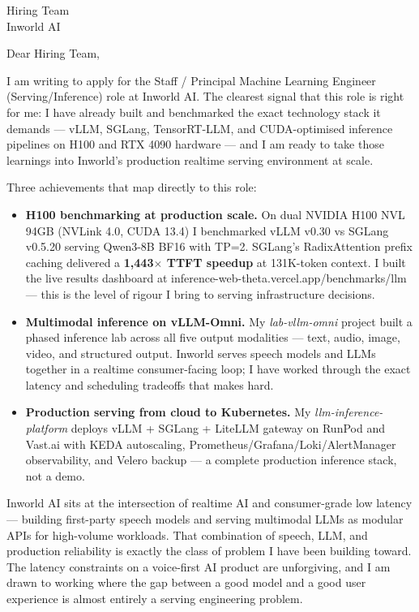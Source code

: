 \documentclass[12pt]{letter}
\date{26 October 2026}
\begin{document}
\begin{letter}{Hiring Team \\ Inworld AI}

\opening{Dear Hiring Team,}

I am writing to apply for the Staff / Principal Machine Learning Engineer (Serving/Inference) role at Inworld AI.
The clearest signal that this role is right for me: I have already built and benchmarked the exact technology stack it demands — vLLM, SGLang, TensorRT-LLM, and CUDA-optimised inference pipelines on H100 and RTX 4090 hardware — and I am ready to take those learnings into Inworld's production realtime serving environment at scale.

Three achievements that map directly to this role:

\begin{itemize}
  \item \textbf{H100 benchmarking at production scale.} On dual NVIDIA H100 NVL 94GB (NVLink 4.0, CUDA 13.4) I benchmarked vLLM v0.30 vs SGLang v0.5.20 serving Qwen3-8B BF16 with TP=2. SGLang's RadixAttention prefix caching delivered a \textbf{1,443$\times$ TTFT speedup} at 131K-token context. I built the live results dashboard at inference-web-theta.vercel.app/benchmarks/llm — this is the level of rigour I bring to serving infrastructure decisions.

  \item \textbf{Multimodal inference on vLLM-Omni.} My \textit{lab-vllm-omni} project built a phased inference lab across all five output modalities — text, audio, image, video, and structured output. Inworld serves speech models and LLMs together in a realtime consumer-facing loop; I have worked through the exact latency and scheduling tradeoffs that makes hard.

  \item \textbf{Production serving from cloud to Kubernetes.} My \textit{llm-inference-platform} deploys vLLM + SGLang + LiteLLM gateway on RunPod and Vast.ai with KEDA autoscaling, Prometheus/Grafana/Loki/AlertManager observability, and Velero backup — a complete production inference stack, not a demo.
\end{itemize}

Inworld AI sits at the intersection of realtime AI and consumer-grade low latency — building first-party speech models and serving multimodal LLMs as modular APIs for high-volume workloads.
That combination of speech, LLM, and production reliability is exactly the class of problem I have been building toward.
The latency constraints on a voice-first AI product are unforgiving, and I am drawn to working where the gap between a good model and a good user experience is almost entirely a serving engineering problem.


\end{letter}
\end{document}
